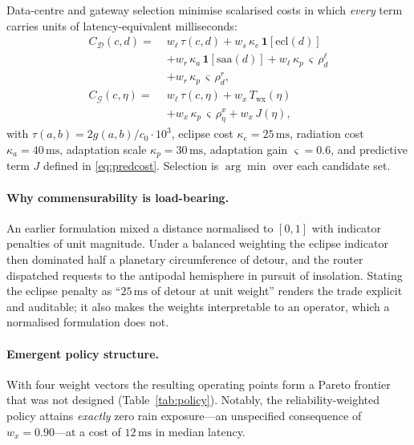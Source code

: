 \documentclass[10pt,twocolumn]{article}
\newcommand{\Ind}[1]{\mathbf{1}\!\left[#1\right]}
\newcommand{\ms}{\,\mathrm{ms}}
\newcommand{\Gset}{\mathcal{G}}
\newcommand{\Dset}{\mathcal{D}}
\begin{document}
Data-centre and gateway selection minimise scalarised costs in which
\emph{every} term carries units of latency-equivalent milliseconds:
\begin{align}
C_{\Dset}(c,d) =\;& w_{\ell}\,\tau(c,d)
+ w_{s}\,\kappa_{e}\,\Ind{\mathrm{ecl}(d)} \nonumber\\
&+ w_{r}\,\kappa_{a}\,\Ind{\mathrm{saa}(d)}
+ w_{\ell}\,\kappa_{p}\,\varsigma\,\rho^{\ell}_{d} \nonumber\\
&+ w_{r}\,\kappa_{p}\,\varsigma\,\rho^{r}_{d},
\label{eq:dccost}\\[2pt]
C_{\Gset}(c,\eta) =\;& w_{\ell}\,\tau(c,\eta)
+ w_{x}\,T_{\mathrm{wx}}(\eta) \nonumber\\
&+ w_{x}\,\kappa_{p}\,\varsigma\,\rho^{x}_{\eta}
+ w_{x}\,J(\eta),
\label{eq:gwcost}
\end{align}
with $\tau(a,b)=2g(a,b)/c_{0}\cdot10^{3}$, eclipse cost $\kappa_{e}=25\ms$,
radiation cost $\kappa_{a}=40\ms$, adaptation scale $\kappa_{p}=30\ms$,
adaptation gain $\varsigma=0.6$, and predictive term $J$ defined in
\eqref{eq:predcost}. Selection is $\arg\min$ over each candidate set.

\paragraph{Why commensurability is load-bearing.} An earlier formulation mixed a
distance normalised to $[0,1]$ with indicator penalties of unit magnitude. Under
a balanced weighting the eclipse indicator then dominated half a planetary
circumference of detour, and the router dispatched requests to the antipodal
hemisphere in pursuit of insolation. Stating the eclipse penalty as
``$25\ms$ of detour at unit weight'' renders the trade explicit and auditable;
it also makes the weights interpretable to an operator, which a normalised
formulation does not.

\paragraph{Emergent policy structure.} With four weight vectors the resulting
operating points form a Pareto frontier that was not designed
(Table~\ref{tab:policy}). Notably, the reliability-weighted policy attains
\emph{exactly} zero rain exposure---an unspecified consequence of
$w_{x}=0.90$---at a cost of $12\ms$ in median latency.
\end{document}
